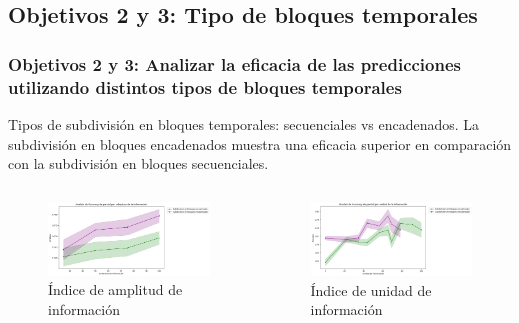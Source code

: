 \documentclass{beamer}
\begin{document}
\subsection{ Objetivos 2 y 3: Tipo de bloques temporales}
\begin{frame}
	\frametitle{Objetivos 2 y 3: Analizar la eficacia de las predicciones utilizando distintos tipos de bloques temporales}
	\begin{block}{Tipos de subdivisión en bloques temporales: secuenciales vs encadenados.}
La subdivisión en bloques encadenados muestra una eficacia superior en comparación con la subdivisión en bloques secuenciales.
	\end{block}
	
	\begin{columns}[c]
	\begin{column}{.5\textwidth}
		\begin{figure}
			\centering
			\includegraphics[width=1\textwidth]{figs/cap7/figura_15}
			\caption{Índice de amplitud de información}
		\end{figure}      
	\end{column}
	\begin{column}{.5\textwidth}
		\begin{figure}
			\centering
			\includegraphics[width=1\textwidth]{figs/cap7/figura_16}
			\caption{Índice de unidad de información}
		\end{figure}
	\end{column}
\end{columns}

\end{frame}
\end{document}

